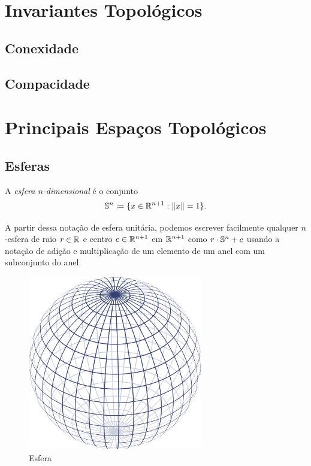 \chapter{Invariantes Topológicos}

\section{Conexidade}

\section{Compacidade}


\chapter{Principais Espaços Topológicos}

\section{Esferas}

\begin{defi}
	A \emph{esfera $n$-dimensional} é o conjunto
	\begin{equation*}
	\mathbb{S}^n \coloneqq \{x \in \mathbb{R}^{n+1}: \left\Vert{x}\right\Vert=1\}.
	\end{equation*}
\end{defi}

A partir dessa notação de esfera unitária, podemos escrever facilmente qualquer $n$-esfera de raio $r \in \mathbb{R}$ e centro $c \in \mathbb{R}^{n+1}$ em $\mathbb{R}^{n+1}$ como $r \cdot \mathbb{S}^n + c$ usando a notação de adição e multiplicação de um elemento de um anel com um subconjunto do anel.

\begin{figure}[!h]
\centering
\includegraphics[width=3in]{./imagens/esfera}
\caption{Esfera}
\end{figure}



